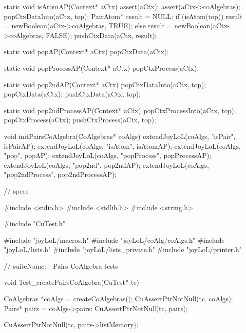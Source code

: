 static void isAtomAP(Context* aCtx) {
  assert(aCtx);
  assert(aCtx->coAlgebras);
  popCtxDataInto(aCtx, top);
  PairAtom* result = NULL;
  if (isAtom(top)) result = newBoolean(aCtx->coAlgebras, TRUE);
  else             result = newBoolean(aCtx->coAlgebras, FALSE);
  pushCtxData(aCtx, result);
}

static void popAP(Context* aCtx) {
  popCtxData(aCtx);
}

static void popProcessAP(Context* aCtx) {
  popCtxProcess(aCtx);
}

static void pop2ndAP(Context* aCtx) {
  popCtxDataInto(aCtx, top);
  popCtxData(aCtx);
  pushCtxData(aCtx, top);
}

static void pop2ndProcessAP(Context* aCtx) {
  popCtxProcessInto(aCtx, top);
  popCtxProcess(aCtx);
  pushCtxProcess(aCtx, top);
}

void initPairsCoAlgebra(CoAlgebras* coAlgs) {
  extendJoyLoL(coAlgs, "isPair",        isPairAP);
  extendJoyLoL(coAlgs, "isAtom",        isAtomAP);
  extendJoyLoL(coAlgs, "pop",           popAP);
  extendJoyLoL(coAlgs, "popProcess",    popProcessAP);
  extendJoyLoL(coAlgs, "pop2nd",        pop2ndAP);
  extendJoyLoL(coAlgs, "pop2ndProcess", pop2ndProcessAP);
}
\stoptyping

\starttyping
// specs

#include <stdio.h>
#include <stdlib.h>
#include <string.h>

#include "CuTest.h"

#include "joyLoL/macros.h"
#include "joyLoL/coAlg/coAlgs.h"
#include "joyLoL/lists.h"
#include "joyLoL/lists_private.h"
#include "joyLoL/printer.h"

// suiteName: - Pairs CoAlgebra tests -

void Test_createPairsCoAlgebra(CuTest* tc) {
  CoAlgebras *coAlgs = createCoAlgebras();
  CuAssertPtrNotNull(tc, coAlgs);
  Pairs* pairs = coAlgs->pairs;
  CuAssertPtrNotNull(tc, pairs);

  CuAssertPtrNotNull(tc, pairs->listMemory);
}

